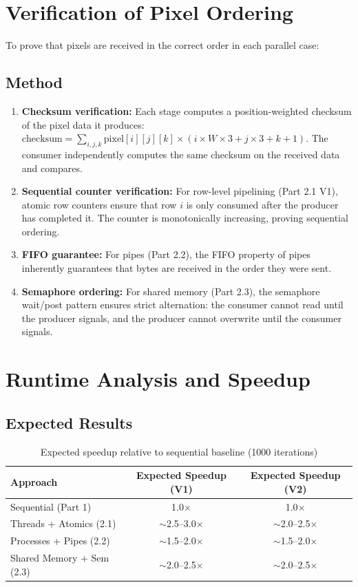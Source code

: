 \documentclass[12pt,a4paper]{article}
\begin{document}
\section{Verification of Pixel Ordering}

To prove that pixels are received in the correct order in each parallel case:

\subsection{Method}
\begin{enumerate}
    \item \textbf{Checksum verification:} Each stage computes a position-weighted checksum of the pixel data it produces: $\text{checksum} = \sum_{i,j,k} \text{pixel}[i][j][k] \times (i \times W \times 3 + j \times 3 + k + 1)$. The consumer independently computes the same checksum on the received data and compares.
    \item \textbf{Sequential counter verification:} For row-level pipelining (Part 2.1 V1), atomic row counters ensure that row $i$ is only consumed after the producer has completed it. The counter is monotonically increasing, proving sequential ordering.
    \item \textbf{FIFO guarantee:} For pipes (Part 2.2), the FIFO property of pipes inherently guarantees that bytes are received in the order they were sent.
    \item \textbf{Semaphore ordering:} For shared memory (Part 2.3), the semaphore wait/post pattern ensures strict alternation: the consumer cannot read until the producer signals, and the producer cannot overwrite until the consumer signals.
\end{enumerate}

\section{Runtime Analysis and Speedup}

\subsection{Expected Results}
\begin{table}[H]
\centering
\begin{tabular}{lcc}
\toprule
\textbf{Approach} & \textbf{Expected Speedup (V1)} & \textbf{Expected Speedup (V2)} \\
\midrule
Sequential (Part 1) & 1.0$\times$ & 1.0$\times$ \\
Threads + Atomics (2.1) & $\sim$2.5--3.0$\times$ & $\sim$2.0--2.5$\times$ \\
Processes + Pipes (2.2) & $\sim$1.5--2.0$\times$ & $\sim$1.5--2.0$\times$ \\
Shared Memory + Sem (2.3) & $\sim$2.0--2.5$\times$ & $\sim$2.0--2.5$\times$ \\
\bottomrule
\end{tabular}
\caption{Expected speedup relative to sequential baseline (1000 iterations)}
\end{table}
\end{document}
